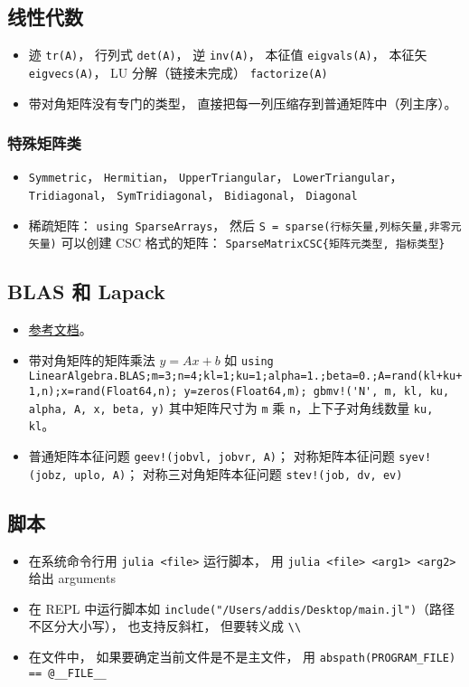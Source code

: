 \subsection{线性代数}
\begin{itemize}
\item 迹 \verb|tr(A)|， 行列式 \verb|det(A)|， 逆 \verb|inv(A)|， 本征值 \verb|eigvals(A)|， 本征矢 \verb|eigvecs(A)|， LU 分解（链接未完成） \verb|factorize(A)|
\item 带对角矩阵没有专门的类型， 直接把每一列压缩存到普通矩阵中（列主序）。
\end{itemize}

\subsubsection{特殊矩阵类}
\begin{itemize}
\item \verb|Symmetric|， \verb|Hermitian|， \verb|UpperTriangular|， \verb|LowerTriangular|， \verb|Tridiagonal|， \verb|SymTridiagonal|， \verb|Bidiagonal|， \verb|Diagonal|
\item 稀疏矩阵： \verb|using SparseArrays|， 然后 \verb|S = sparse(行标矢量,列标矢量,非零元矢量)| 可以创建 CSC 格式的矩阵： \verb|SparseMatrixCSC{矩阵元类型, 指标类型}|
\end{itemize}

\subsection{BLAS 和 Lapack}
\begin{itemize}
\item \href{https://docs.julialang.org/en/v1/stdlib/LinearAlgebra/}{参考文档}。
\item 带对角矩阵的矩阵乘法 $y = Ax+b$ 如 \verb|using LinearAlgebra.BLAS;m=3;n=4;kl=1;ku=1;alpha=1.;beta=0.;A=rand(kl+ku+1,n);x=rand(Float64,n); y=zeros(Float64,m); gbmv!('N', m, kl, ku, alpha, A, x, beta, y)| 其中矩阵尺寸为 \verb|m| 乘 \verb|n|，上下子对角线数量 \verb|ku, kl|。
\item 普通矩阵本征问题 \verb|geev!(jobvl, jobvr, A)|； 对称矩阵本征问题 \verb|syev!(jobz, uplo, A)|； 对称三对角矩阵本征问题 \verb|stev!(job, dv, ev)|
\end{itemize}

\subsection{脚本}
\begin{itemize}
\item 在系统命令行用 \verb|julia <file>| 运行脚本， 用 \verb|julia <file> <arg1> <arg2>| 给出 arguments
\item 在 REPL 中运行脚本如 \verb|include("/Users/addis/Desktop/main.jl")|（路径不区分大小写）， 也支持反斜杠， 但要转义成 \verb|\\|
\item 在文件中， 如果要确定当前文件是不是主文件， 用 \verb|abspath(PROGRAM_FILE) == @__FILE__|
\end{itemize}

